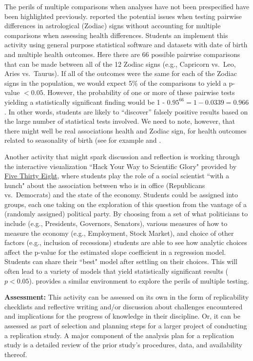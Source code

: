 \documentclass[
  12pt]{article}
\begin{document}
The perils of multiple comparisons when analyses have not been prespecified have been highlighted previously.
\cite{austin:2006} reported the potential issues when testing pairwise differences in astrological (Zodiac) signs without accounting for multiple comparisons when assessing health differences.
Students an implement this activity using general purpose statistical software and datasets with date of birth and multiple health outcomes.
Here there are 66 possible pairwise comparisons that can be made between all of the 12 Zodiac signs (e.g., Capricorn vs.\ Leo, Aries vs.\ Taurus).
If all of the outcomes were the same for each of the Zodiac signs in the population, we would expect 5\% of the comparisons to yield a p-value $< 0.05$.
However, the probability of one or more of these pairwise tests yielding a statistically significant finding would be 1 - $0.95^{66} = 1 - 0.0339 = 0.966$.
In other words, students are likely to ``discover'' falsely positive results based on the large number of statistical tests involved.
We need to note, however, that there might well be real associations health and Zodiac sign, for health outcomes related to seasonality of birth (see for example \cite{carm:2022} and \cite{schiz:2005}.


Another activity that might spark discussion and reflection is working through the interactive visualization ``Hack Your Way to Scientific Glory" provided by \href{https://web.archive.org/web/20250117051842/http://projects.fivethirtyeight.com/p-hacking}{Five Thirty Eight}, where students play the role of a social scientist ``with a hunch" about the association between who is in office (Republicans vs.\ Democrats) and the state of the economy.
Students could be assigned into groups, each one taking on the exploration of this question from the vantage of a (randomly assigned) political party.
By choosing from a set of what politicians to include (e.g., Presidents, Governors, Senators), various measures of how to measure the economy (e.g., Employment, Stock Market), and choice of other factors (e.g., inclusion of recessions) students are able to see how analytic choices affect the p-value for the estimated slope coefficient in a regression model.
Students can share their ``best" model after settling on their choices.
This will often lead to a variety of models that yield statistically significant results ($p < 0.05$).
\cite{p-hacker} provides a similar environment to explore the perils of multiple testing.


\textbf{Assessment:} This activity can be assessed on its own in the form of replicability checklists and reflective writing and/or discussion about challenges encountered and implications for the progress of knowledge in their discipline.
Or, it can be assessed as part of selection and planning steps for a larger project of conducting a replication study.
A major component of the analysis plan for a replication study is a detailed review of the prior study's procedures, data, and availability thereof.
\end{document}
